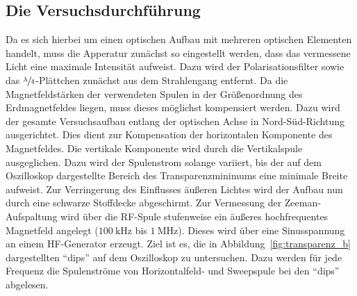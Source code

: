 \documentclass[
  bibliography=totoc,     %
  captions=tableheading,  %
  titlepage=firstiscover, %
]{scrartcl}
\begin{document}
\subsection{Die Versuchsdurchführung}
Da es sich hierbei um einen optischen Aufbau mit mehreren optischen Elementen
handelt, muss die Apperatur zunächst so eingestellt werden, dass das vermessene
Licht eine maximale Intensität aufweist. Dazu wird der Polarisationsfilter
sowie das $\sfrac{\lambda}{4}$-Plättchen zunächst aus dem Strahlengang entfernt.
Da die Magnetfeldstärken der verwendeten Spulen in der Größenordnung des
Erdmagnetfeldes liegen, muss dieses möglichst kompensiert werden. Dazu wird der
gesamte Versuchsaufbau entlang der optischen Achse in Nord-Süd-Richtung
ausgerichtet. Dies dient zur Kompensation der horizontalen Komponente des
Magnetfeldes. Die vertikale Komponente wird durch die Vertikalspule
ausgeglichen. Dazu wird der Spulenstrom solange variiert, bis der auf dem
Oszilloskop dargestellte Bereich des Transparenzminimums eine minimale Breite aufweist.
Zur Verringerung des Einflusses äußeren Lichtes wird der Aufbau nun durch eine
schwarze Stoffdecke abgeschirmt.
\clearpage
\noindent
Zur Vermessung der Zeeman-Aufspaltung wird über die RF-Spule stufenweise ein äußeres
hochfrequentes Magnetfeld angelegt ($\SI{100}{\kilo\hertz}$ bis $\SI{1}{\mega\hertz}$).
Dieses wird über eine Sinusspannung an einem HF-Generator erzeugt. Ziel ist es, die in
Abbildung~\ref{fig:transparenz_b} dargestellten \enquote{dips} auf dem Oszilloskop
zu untersuchen. Dazu werden für jede Frequenz die Spulenströme von Horizontalfeld-
und Sweepspule bei den \enquote{dips} abgelesen.\\
\end{document}
